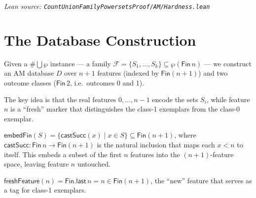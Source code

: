 \emph{Lean source: \texttt{CountUnionFamilyPowersetsProof/AM/Hardness.lean}}

\section{The Database Construction}

Given a $\#\bigcup\wp$ instance --- a family $\mathcal{F} = \{S_1, \ldots, S_k\}
\subseteq \wp(\mathsf{Fin}\,n)$ --- we construct an AM database $D$ over $n+1$
features (indexed by $\mathsf{Fin}(n+1)$) and two outcome classes
($\mathsf{Fin}\,2$, i.e.\ outcomes 0 and 1).

The key idea is that the real features $0, \ldots, n-1$ encode the sets $S_i$,
while feature $n$ is a ``fresh'' marker that distinguishes the class-1 exemplars
from the class-0 exemplar.

\begin{definition}
  \label{def:embed-fin}
  \leanok
  $\mathsf{embedFin}(S) = \{ \mathsf{castSucc}(x) \mid x \in S \} \subseteq
  \mathsf{Fin}(n+1)$, where $\mathsf{castSucc} : \mathsf{Fin}\,n \to
  \mathsf{Fin}(n+1)$ is the natural inclusion that maps each $x < n$ to itself.
  This embeds a subset of the first $n$ features into the $(n+1)$-feature space,
  leaving feature $n$ untouched.
\end{definition}

\begin{definition}
  \label{def:fresh-feature}
  \leanok
  $\mathsf{freshFeature}(n) = \mathsf{Fin.last}\,n = n \in \mathsf{Fin}(n+1)$,
  the ``new'' feature that serves as a tag for class-1 exemplars.
\end{definition}

